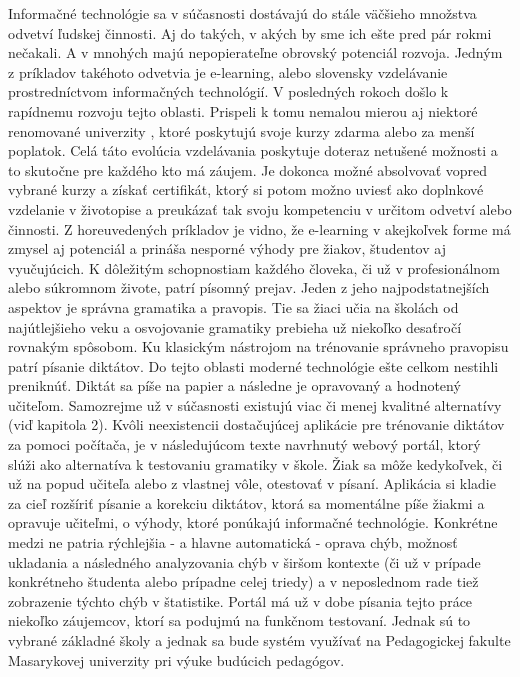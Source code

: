 \documentclass[12pt,oneside]{fithesis2}
\begin{document}
  Informačné technológie sa v súčasnosti dostávajú do stále väčšieho množstva odvetví ľudskej činnosti. Aj do takých, v akých by sme ich ešte pred pár rokmi nečakali. A v mnohých majú nepopierateľne obrovský potenciál rozvoja. Jedným z príkladov takéhoto odvetvia je e-learning, alebo slovensky vzdelávanie prostredníctvom informačných technológií. V posledných rokoch došlo k rapídnemu rozvoju tejto oblasti. Prispeli k tomu nemalou mierou aj niektoré renomované univerzity \cite{crimson15}, ktoré poskytujú svoje kurzy zdarma alebo za menší poplatok. Celá táto evolúcia vzdelávania poskytuje doteraz netušené možnosti a to skutočne pre každého kto má záujem. Je dokonca možné absolvovať vopred vybrané kurzy a získať certifikát, ktorý si potom možno uviesť ako doplnkové vzdelanie v životopise a preukázať tak svoju kompetenciu v určitom odvetví alebo činnosti. Z horeuvedených príkladov je vidno, že e-learning v akejkoľvek forme má zmysel aj potenciál a prináša nesporné výhody pre žiakov, študentov aj vyučujúcich. 
  K dôležitým schopnostiam každého človeka, či už v profesionálnom alebo súkromnom živote, patrí písomný prejav. Jeden z jeho najpodstatnejších aspektov je správna gramatika a pravopis. Tie sa žiaci učia na školách od najútlejšieho veku a osvojovanie gramatiky prebieha už niekoľko desaťročí rovnakým spôsobom. Ku klasickým nástrojom na trénovanie správneho pravopisu patrí písanie diktátov. Do tejto oblasti moderné technológie ešte celkom nestihli preniknúť. Diktát sa píše na papier a následne je opravovaný a hodnotený učiteľom. Samozrejme už v súčasnosti existujú viac či menej kvalitné alternatívy (viď kapitola 2). 
  Kvôli neexistencii dostačujúcej aplikácie pre trénovanie diktátov za pomoci počítača, je v následujúcom texte navrhnutý webový portál, ktorý slúži ako alternatíva k testovaniu gramatiky v škole. Žiak sa môže kedykoľvek, či už na popud učiteľa alebo z vlastnej vôle, otestovať v písaní. Aplikácia si kladie za cieľ rozšíriť písanie a korekciu diktátov, ktorá sa momentálne píše žiakmi a opravuje učiteľmi, o výhody, ktoré ponúkajú informačné technológie. Konkrétne medzi ne patria rýchlejšia - a hlavne automatická - oprava chýb, možnosť ukladania a následného analyzovania chýb v širšom kontexte (či už v prípade konkrétneho študenta alebo prípadne celej triedy) a v neposlednom rade tiež zobrazenie týchto chýb v štatistike.
  Portál má už v dobe písania tejto práce niekoľko záujemcov, ktorí sa podujmú na funkčnom testovaní. Jednak sú to vybrané základné školy a jednak sa bude systém využívať na Pedagogickej fakulte Masarykovej univerzity pri výuke budúcich pedagógov.
    
\end{document}
